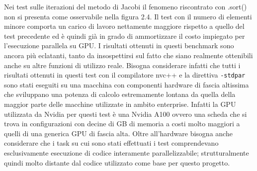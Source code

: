 \documentclass[12pt,a4paper]{report}
\begin{document}
\begin{figure}[H]
\centering
\begin{floatrow}[1]
\end{floatrow}
\end{figure} 

Nei test sulle iterazioni del metodo di Jacobi il fenomeno riscontrato con .sort() non si presenta come osservabile nella figura 2.4. Il test con il numero di elementi minore comporta un carico di lavoro nettamente maggiore rispetto a quello del test precedente ed è quindi già in grado di ammortizzare il costo impiegato per l'esecuzione parallela su GPU.
I risultati ottenuti in questi benchmark sono ancora più eclatanti, tanto da insospettirsi sul fatto che siano realmente ottenibili anche su altre funzioni di utilizzo reale. \newline
Bisogna considerare infatti che tutti i risultati ottenuti in questi test con il compilatore nvc++ e la direttiva \verb|-stdpar| sono stati eseguiti su una macchina con componenti hardware di fascia altissima che sviluppano una potenza di calcolo estremamente lontana da quella della maggior parte delle macchine utilizzate in ambito enterprise. Infatti la GPU utilizzata da Nvidia per questi test è una Nvidia A100 ovvero una scheda che si trova in configurazioni con decine di GB di memoria a costi molto maggiori a quelli di una generica GPU di fascia alta. \newline
Oltre all'hardware bisogna anche considerare che i task su cui sono stati effettuati i test comprendevano esclusivamente esecuzione di codice interamente parallelizzabile; strutturalmente quindi molto distante dal codice utilizzato come base per questo progetto.
\end{document}

